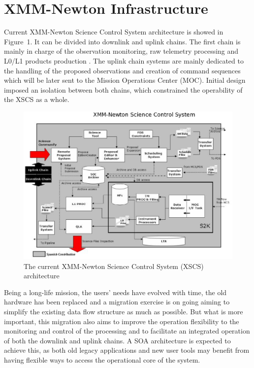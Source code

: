 \section{XMM-Newton Infrastructure}
Current XMM-Newton Science Control System architecture is showed in Figure~1. It can be divided into downlink and uplink chains. The first chain is mainly in charge of the observation monitoring, raw telemetry processing and L0/L1 products production \citep{vallejo11}. The uplink chain systems are mainly dedicated to the handling of the proposed observations and creation of command sequences which will be later sent to the Mission Operations Center (MOC). Initial design imposed an isolation between both chains, which constrained the operability of the XSCS as a whole. 
\begin{figure}[h]
\centering
\includegraphics[width=90 mm]{part10/Perez_P022/P022_f1.eps}
\caption{The current XMM-Newton Science Control System (XSCS) architecture}
\label{fig:1}
\end{figure}
Being a long-life mission, the users' needs have evolved with time, the old hardware has been replaced and a migration exercise is on going aiming to simplify the existing data flow structure as much as possible. But what is more important, this migration also aims to improve the operation flexibility to the monitoring and control of the processing and to facilitate an integrated operation of both the downlink and uplink chains. A SOA architecture is expected to achieve this, as both old legacy applications and new user tools may benefit from having flexible ways to access the operational core of the system. 

